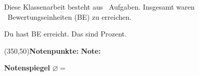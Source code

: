 \begin{coverpages}
\begin{center}
\vspace*{0.7cm}
Diese Klassenarbeit besteht aus \numquestions\ Aufgaben. Insgesamt waren \numpoints\ Bewertungseinheiten (BE) zu erreichen. \smallskip

Du hast \underline{\hspace*{1.5cm}} BE erreicht. Das sind \underline{\hspace*{1.5cm}} Prozent. \medskip


\framebox(350,50){\textbf{Notenpunkte:} \underline{\hspace*{2cm}} \hspace*{1cm} \textbf{Note:} \underline{\hspace*{2cm}}}


\end{center}

\vfill

\newcommand{\tabledef}{G}
\textbf{Notenspiegel}
\vspace*{-0.6cm}
\ntable
\centering \vspace*{-1cm}
$\varnothing =$
\end{coverpages}
\restoregeometry
